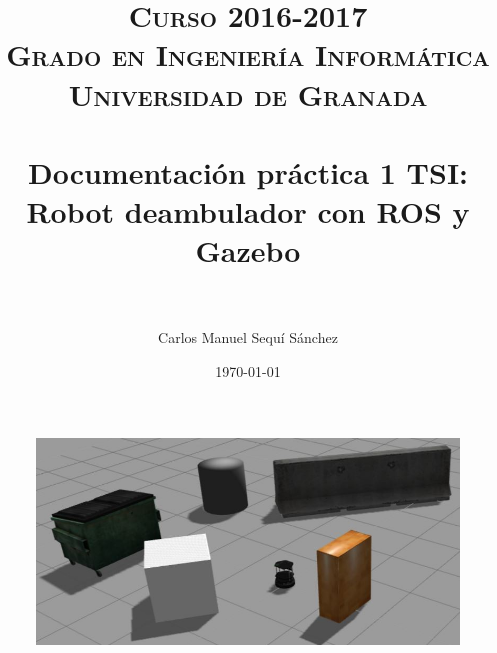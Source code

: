 


\title{	
\normalfont \normalsize 
\textsc{\textbf{Curso 2016-2017} \\ Grado en Ingeniería Informática \\ Universidad de Granada} \\ [25pt] %
\horrule{0.5pt} \\[0.4cm] %
\huge Documentación práctica 1 TSI: \\Robot deambulador con ROS y Gazebo \\ %
\horrule{2pt} \\[0.5cm] %
}

\author{Carlos Manuel Sequí Sánchez} %

\date{\normalsize\today} %




\maketitle %

\begin{figure}[H] %
	\centering
	\includegraphics[scale=0.7]{1} 
\end{figure}

